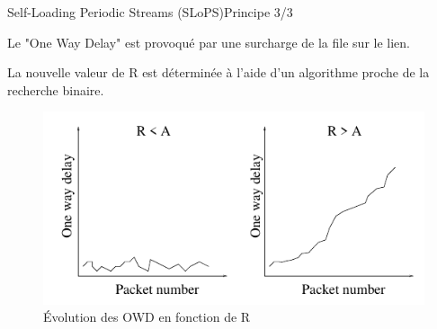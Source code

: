 \documentclass[compress]{beamer}
\begin{document}
\begin{frame}{Self-Loading Periodic Streams (SLoPS)}{Principe 3/3}

Le "One Way Delay" est provoqué par une surcharge de la file
sur le lien.

La nouvelle valeur de R est déterminée à l'aide d'un algorithme
proche de la recherche binaire.

\begin{figure}[hbtp]
		\centering
		\includegraphics[scale=0.4]{slopsOWD.png}
		\caption{Évolution des OWD en fonction de R}
\end{figure}

\end{frame}
\end{document}
